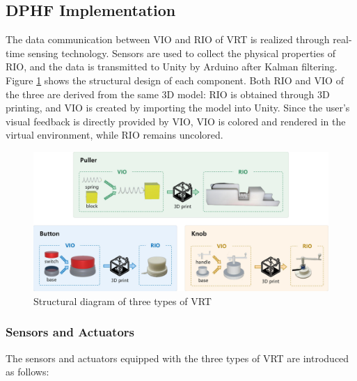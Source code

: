 \documentclass[runningheads]{llncs}
\begin{document}
\subsection{DPHF Implementation}
The data communication between VIO and RIO of VRT is realized through real-time sensing technology. Sensors are used to collect the physical properties of RIO, and the data is transmitted to Unity by Arduino after Kalman filtering. Figure \ref{fig:structural-diagram} shows the structural design of each component. Both RIO and VIO of the three are derived from the same 3D model: RIO is obtained through 3D printing, and VIO is created by importing the model into Unity. Since the user's visual feedback is directly provided by VIO, VIO is colored and rendered in the virtual environment, while RIO remains uncolored.

\begin{figure}[t]
  \centering
  \includegraphics[width=1\textwidth]{image/Structural-Diagram.pdf}
  \caption{Structural diagram of three types of VRT}
  \label{fig:structural-diagram}
\end{figure}

\subsubsection{Sensors and Actuators}
The sensors and actuators equipped with the three types of VRT are introduced as follows:
\end{document}
